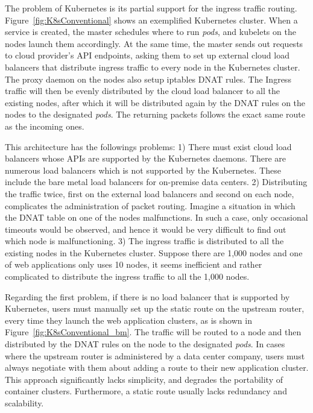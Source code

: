 The problem of Kubernetes is its partial support for the ingress traffic routing.
Figure~\ref{fig:K8sConventional} shows an exemplified Kubernetes cluster.
When a service is created, the master schedules where to run {\em pods}, and kubelets on the nodes launch them accordingly.
At the same time, the master sends out requests to cloud provider's API endpoints, asking them to set up external cloud load balancers that distribute ingress traffic to every node in the Kubernetes cluster.
The proxy daemon on the nodes also setup iptables DNAT\cite{MartinA.Brown2017} rules. 
The Ingress traffic will then be evenly distributed by the cloud load balancer to all the existing nodes, 
after which it will be distributed again by the DNAT rules on the nodes to the designated {\em pods}. 
The returning packets follows the exact same route as the incoming ones.

This architecture has the followings problems: 
1) There must exist cloud load balancers whose APIs are supported by the Kubernetes daemons.
There are numerous load balancers which is not supported by the Kubernetes.
These include the bare metal load balancers for on-premise data centers.
2) Distributing the traffic twice, first on the external load balancers and second on each node, complicates the administration of packet routing. 
Imagine a situation in which the DNAT table on one of the nodes malfunctions.
In such a case, only occasional timeouts would be observed, and hence it would be very difficult to find out which node is malfunctioning.   
3) The ingress traffic is distributed to all the existing nodes in the Kubernetes cluster. 
Suppose there are 1,000 nodes and one of web applications only uses 10 nodes, it seems inefficient and rather complicated to distribute the ingress traffic to all the 1,000 nodes.

Regarding the first problem, if there is no load balancer that is supported by Kubernetes, users must manually set up the static route on the upstream router, every time they launch the web application clusters, as is shown in Figure~\ref{fig:K8sConventional_bm}.
The traffic will be routed to a node and then distributed by the DNAT rules on the node to the designated {\em pods}.
In cases where the upstream router is administered by a data center company, users must always negotiate with them about adding a route to their new application cluster.
This approach significantly lacks simplicity, and degrades the portability of container clusters.
Furthermore, a static route usually lacks redundancy and scalability.

